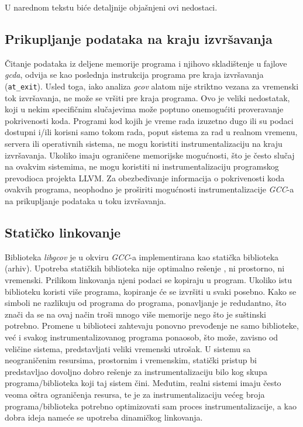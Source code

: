 \documentclass[12pt,oneside]{memoir}
\newcommand{\kod}[1]{\texttt{#1}}
\newcommand{\strano}[1]{\textit{#1}}
\begin{document}
U narednom tekstu biće detaljnije objašnjeni ovi nedostaci.

\subsection{Prikupljanje podataka na kraju izvršavanja}


Čitanje podataka iz deljene memorije programa i njihovo skladištenje u fajlove \strano{gcda}, odvija se kao poslednja instrukcija programa pre kraja izvršavanja (\kod{at\_exit}). Usled toga, iako analiza \strano{gcov} alatom nije striktno vezana za vremenski tok izvršavanja, ne može se vršiti pre kraja programa. Ovo je veliki nedostatak, koji u nekim specifičnim slučajevima može poptuno onemogućiti proveravanje pokrivenosti koda. Programi kod kojih je vreme rada izuzetno dugo ili su podaci dostupni i/ili korisni samo tokom rada, poput sistema za rad u realnom vremenu, servera ili operativnih sistema, ne mogu koristiti instrumentalizaciju na kraju izvršavanja. Ukoliko imaju ograničene memorijske mogućnosti, što je često slučaj na ovakvim sistemima, ne mogu koristiti ni instrumentalizaciju programskog prevodioca projekta LLVM. Za obezbeđivanje informacija o pokrivenosti koda ovakvih programa, neophodno je proširiti mogućnosti instrumentalizacije \strano{GCC}-a na prikupljanje podataka u toku izvršavanja.


\subsection{Statičko linkovanje}


Biblioteka \strano{libgcov} je u okviru \strano{GCC}-a implementirana kao statička biblioteka (arhiv). Upotreba statičkih biblioteka nije optimalno rešenje \cite{staVSdinLINK}, ni prostorno, ni vremenski. Prilikom linkovanja njeni podaci se kopiraju u program. Ukoliko istu biblioteku koristi više programa, kopiranje će se izvršiti u svaki posebno. Kako se simboli ne razlikuju od programa do programa, ponavljanje je redudantno, što znači da se na ovaj način troši mnogo više memorije nego što je suštinski potrebno. Promene u biblioteci zahtevaju ponovno prevođenje ne samo biblioteke, već i svakog instrumentalizovanog programa ponaosob, što može, zavisno od veličine sistema, predstavljati veliki vremenski utrošak. U sistemu sa neograničenim resursima, prostornim i vremenskim, statički pristup bi predstavljao dovoljno dobro rešenje za instrumentalizaciju bilo kog skupa programa/biblioteka koji taj sistem čini. Međutim, realni sistemi imaju često veoma oštra ograničenja resursa, te je za instrumentalizaciju većeg broja programa/biblioteka potrebno optimizovati sam proces instrumentalizacije, a kao dobra ideja nameće se upotreba dinamičkog linkovanja.
\end{document}
